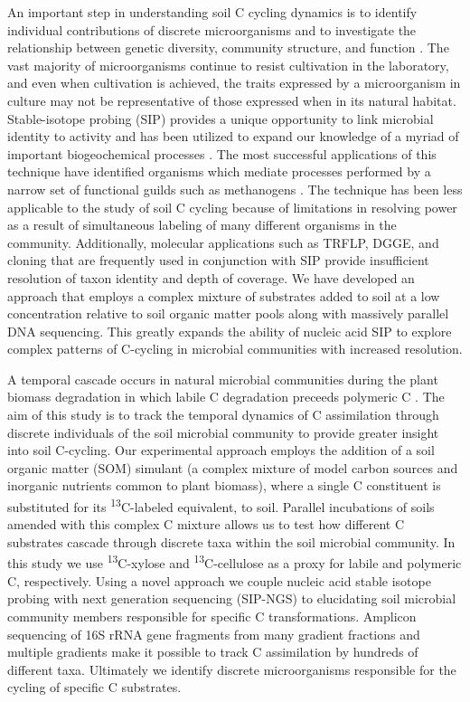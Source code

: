 An important step in understanding soil C cycling dynamics is to identify individual contributions of discrete microorganisms and to investigate the relationship between genetic diversity, community structure, and function \citep{O_Donnell_2002}. The vast majority of microorganisms continue to resist cultivation in the laboratory, and even when cultivation is achieved, the traits expressed by a microorganism in culture may not be representative of those expressed when in its natural habitat. Stable-isotope probing (SIP) provides a unique opportunity to link microbial identity to activity and has been utilized to expand our knowledge of a myriad of important biogeochemical processes \citep{Chen_Murrell_2010}. The most successful applications of this technique have identified organisms which mediate processes performed by a narrow set of functional guilds such as methanogens \citep{Lu_2005}. The technique has been less applicable to the study of soil C cycling because of limitations in resolving power as a result of simultaneous labeling of many different organisms in the community. Additionally, molecular applications such as TRFLP, DGGE, and cloning that are frequently used in conjunction with SIP provide insufficient resolution of taxon identity and depth of coverage. We have developed an approach that employs a complex mixture of substrates added to soil at a low concentration relative to soil organic matter pools along with massively parallel DNA sequencing. This greatly expands the ability of nucleic acid SIP to explore complex patterns of C-cycling in microbial communities with increased resolution.

A temporal cascade occurs in natural microbial communities during the plant biomass degradation in which labile C degradation preceeds polymeric C \citep{Hu_1997,Rui_2009}. The aim of this study is to track the temporal dynamics of C assimilation through discrete individuals of the soil microbial community to provide greater insight into soil C-cycling. Our experimental approach employs the addition of a soil organic matter (SOM) simulant (a complex mixture of model carbon sources and inorganic nutrients common to plant biomass), where a single C constituent is substituted for its \textsuperscript{13}C-labeled equivalent, to soil. Parallel incubations of soils amended with this complex C mixture allows us to test how different C substrates cascade through discrete taxa within the soil microbial community. In this study we use \textsuperscript{13}C-xylose and \textsuperscript{13}C-cellulose as a proxy for labile and polymeric C, respectively. Using a novel approach we couple nucleic acid stable isotope probing with next generation sequencing (SIP-NGS) to elucidating soil microbial community members responsible for specific C transformations. Amplicon sequencing of 16S rRNA gene fragments from many gradient fractions and multiple gradients make it possible to track C assimilation by hundreds of different taxa. Ultimately we identify discrete microorganisms responsible for the cycling of specific C substrates. 